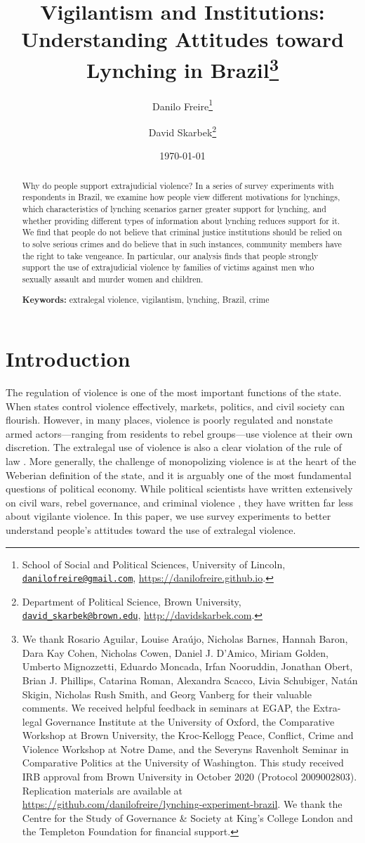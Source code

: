\documentclass[12pt,ansiapaper]{article}
\title{Vigilantism and Institutions:\\ Understanding Attitudes toward Lynching in Brazil\footnote{We thank Rosario Aguilar, Louise Araújo, Nicholas Barnes, Hannah Baron, Dara Kay Cohen, Nicholas Cowen, Daniel J. D'Amico, Miriam Golden, Umberto Mignozzetti, Eduardo Moncada, Irfan Nooruddin, Jonathan Obert, Brian J. Phillips, Catarina Roman, Alexandra Scacco, Livia Schubiger, Natán Skigin, Nicholas Rush Smith, and Georg Vanberg for their valuable comments. We received helpful feedback in seminars at EGAP, the Extra-legal Governance Institute at the University of Oxford, the Comparative Workshop at Brown University, the Kroc-Kellogg Peace, Conflict, Crime and Violence Workshop at Notre Dame, and the Severyns Ravenholt Seminar in Comparative Politics at the University of Washington. This study received IRB approval from Brown University in October 2020 (Protocol 2009002803). Replication materials are available at \url{https://github.com/danilofreire/lynching-experiment-brazil}. We thank the Centre for the Study of Governance \& Society at King's College London and the Templeton Foundation for financial support.}}
\author{Danilo Freire\footnote{School of Social and Political Sciences, University of Lincoln, \href{mailto:danilofreire@gmail.com}{\texttt{danilofreire@gmail.com}}, \url{https://danilofreire.github.io}.} \and David Skarbek\footnote{Department of Political Science, Brown University, \href{mailto:david_skarbek@brown.edu}{\texttt{david\_skarbek@brown.edu}}, \url{http://davidskarbek.com}.}}
\date{\today}
\begin{document}
\maketitle

\begin{abstract}
\doublespacing \noindent Why do people support extrajudicial violence? In a series of survey experiments with respondents in Brazil, we examine how people view different motivations for lynchings, which characteristics of lynching scenarios garner greater support for lynching, and whether providing different types of information about lynching reduces support for it. We find that people do not believe that criminal justice institutions should be relied on to solve serious crimes and do believe that in such instances, community members have the right to take vengeance. In particular, our analysis finds that people strongly support the use of extrajudicial violence by families of victims against men who sexually assault and murder women and children. 
\vspace{.25cm}

\noindent \textbf{Keywords:} extralegal violence, vigilantism, lynching, Brazil, crime 
\vspace{.25cm}

\end{abstract}

\newpage

\section{Introduction}
\label{sec:introduction}

\doublespacing

The regulation of violence is one of the most important functions of the state. When states control violence effectively, markets, politics, and civil society can flourish. However, in many places, violence is poorly regulated and nonstate armed actors---ranging from residents to rebel groups---use violence at their own discretion. The extralegal use of violence is also a clear violation of the rule of law \citep[48-49]{blair2020peacekeeping}. More generally, the challenge of monopolizing violence is at the heart of the Weberian definition of the state, and it is arguably one of the most fundamental questions of political economy. While political scientists have written extensively on civil wars, rebel governance, and criminal violence \citep{arjona2016rebelocracy, trejo2021high, barnes2017criminal}, they have written far less about vigilante violence. In this paper, we use survey experiments to better understand people's attitudes toward the use of extralegal violence. 
\end{document}
